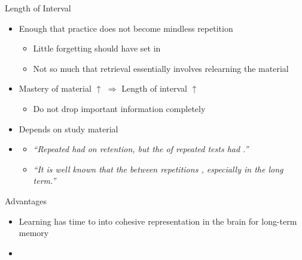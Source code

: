 \documentclass{ercisbeamer}
\begin{document}
\begin{frame}{Length of Interval}
    \begin{tbox}
        \begin{itemize}
            \item Enough that practice does not become mindless repetition
            \begin{itemize}
                \item Little forgetting should have set in
                \item Not so much that retrieval essentially involves relearning the material
            \end{itemize}
            \item Mastery of material $\uparrow$ $\Rightarrow$ Length of interval $\uparrow$
            \begin{itemize}
                \item Do not drop important information completely
            \end{itemize}
            \item Depends on study material
        \end{itemize}
    \end{tbox}
    
    \hspace{2em}
    
    \begin{tbox}
        \begin{itemize}
            \item \citet{karpicke11}
            \begin{itemize}
                \item \emph{``Repeated  had  on retention, but the  of repeated tests had .''}
                \item \emph{``It is well known that  the  between repetitions , especially in the long term.''}
            \end{itemize}
        \end{itemize}
    \end{tbox}
\end{frame}
\setbgimage{}

\begin{frame}{Advantages}
    \begin{itemize}
        \item Learning has time to  into cohesive representation in the brain for long-term memory
        \item {}
    \end{itemize}
\end{frame}
\end{document}
